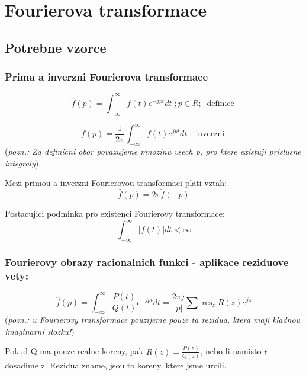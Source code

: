\chapter{Fourierova transformace}

\section*{Potrebne vzorce}

\subsection*{Prima a inverzni Fourierova transformace}
\begin{equation}
\label{eq:definice}
\hat{f}(p) = \int_{-\infty}^\infty f(t) e^{-jpt} dt \; ; p \in R ; \; \operatorname{definice}
\end{equation}

\begin{equation}
\label{eq:inv_ttop}
\check{f}(p) = \frac{1}{2\pi}\int_{-\infty}^{\infty} f(t) e^{jpt} dt \; ; \operatorname{inverzni}
\end{equation}
(\textit{pozn.: Za definicni obor povazujeme mnozinu vsech p, pro ktere existuji prislusne integraly}).

Mezi primou a inverzni Fourierovou transformaci plati vztah:
\begin{equation}
\label{eq:pain}
\hat{f}(p) = 2\pi \check{f}(-p)
\end{equation}

Postacujici podminka pro existenci Fourierovy transformace: 
\begin{equation}
\int_{-\infty}^\infty |f(t)|dt < \infty
\end{equation}

\subsection*{Fourierovy obrazy racionalnich funkci - aplikace reziduove vety:}
\begin{equation}
\label{eq:rez}
\hat{f}(p)=\int_{-\infty}^{\infty} \frac{P(t)}{Q(t)}e^{-jpt}dt = \frac{2 \pi j}{|p|}\sum \operatorname{res}_z R(z)e^{jz}
\end{equation}
(\textit{pozn.: u Fourierovy transformace pouzijeme pouze ta rezidua, ktera maji kladnou imaginarni slozku!})

Pokud Q ma pouze realne koreny, pak $R(z)=\frac{P(z)}{Q(z)}$, nebo-li namisto $t$ dosadime z. Rezidua zname, jsou to koreny, ktere jsme urcili.
 
